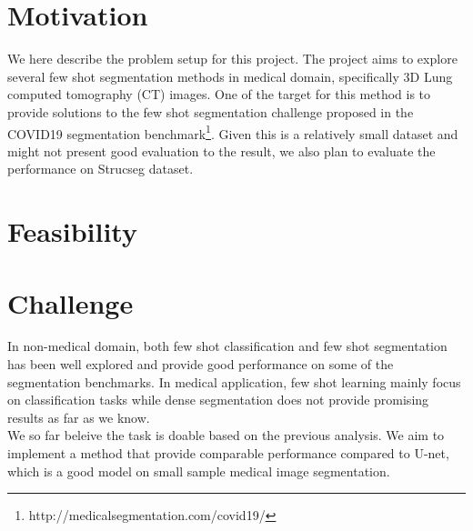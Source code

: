 \section{Motivation}

We here describe the problem setup for this project. The project aims to explore several few shot segmentation methods in medical domain, specifically 3D Lung computed tomography (CT) images. One of the target for this method is to provide solutions to the few shot segmentation challenge proposed in the COVID19 segmentation benchmark\footnote{http://medicalsegmentation.com/covid19/}. Given this is a relatively small dataset and might not present good evaluation to the result, we also plan to evaluate the performance on Strucseg dataset.
\section{Feasibility}
\section{Challenge}
In non-medical domain, both few shot classification and few shot segmentation has been well explored and provide good performance on some of the segmentation benchmarks. In medical application, few shot learning mainly focus on classification tasks while dense segmentation does not provide promising results as far as we know.\\

We so far beleive the task is doable based on the previous analysis. We aim to implement a method that provide comparable performance compared to U-net, which is a good model on small sample medical image segmentation.